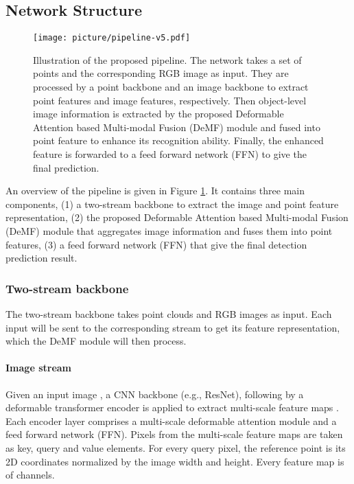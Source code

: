 \documentclass[runningheads]{llncs}
\begin{document}
\subsection{Network Structure}

\begin{figure}[t]
    \centering
    \texttt{[image: picture/pipeline-v5.pdf]}
    \caption{Illustration of the proposed pipeline. The network takes a set of points and the corresponding RGB image as input. They are processed by a point backbone and an image backbone to extract point features and image features, respectively. Then object-level image information is extracted by the proposed Deformable Attention based Multi-modal Fusion (DeMF) module and fused into point feature to enhance its recognition ability. Finally, the enhanced feature is forwarded to a feed forward network (FFN) to give the final prediction.}
    \label{fig:pipeline}
\end{figure}

 An overview of the pipeline is given in Figure \ref{fig:pipeline}. It contains three main components, (1) a two-stream backbone to extract the image and point feature representation, (2) the proposed Deformable Attention based Multi-modal Fusion (DeMF) module that aggregates image information and fuses them into point features, (3) a feed forward network (FFN) that give the final detection prediction result.

\subsubsection{Two-stream backbone}

The two-stream backbone takes point clouds and RGB images as input. Each input will be sent to the corresponding stream to get its feature representation, which the DeMF module will then process.

\paragraph{Image stream}

Given an input image , a CNN backbone (e.g., ResNet), following by a deformable transformer encoder is applied to extract multi-scale feature maps . Each encoder layer comprises a multi-scale deformable attention module and a feed forward network (FFN). Pixels from the multi-scale feature maps are taken as key, query and value elements. For every query pixel, the reference point is its 2D coordinates normalized by the image width and height. Every feature map is of  channels.
\end{document}
